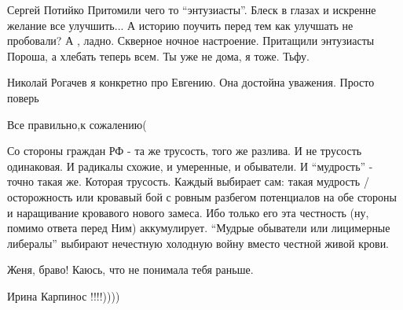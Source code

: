 \begin{itemize}
Сергей Потийко Притомили чего то \enquote{энтузиасты}. Блеск в глазах и искренне
желание все улучшить... А историю поучить перед тем как улучшать не пробовали?
А , ладно. Скверное ночное настроение. Притащили энтузиасты Пороша, а хлебать
теперь всем. Ты уже не дома, я тоже. Тьфу.


Николай Рогачев я конкретно про Евгению. Она достойна уважения. Просто поверь


Все правильно,к сожалению(


Со стороны граждан РФ - та же трусость, того же разлива. И не трусость
одинаковая. И радикалы схожие, и умеренные, и обыватели. И \enquote{мудрость} - точно
такая же. Которая трусость. Каждый выбирает сам: такая мудрость / осторожность
или кровавый бой с ровным разбегом потенциалов на обе стороны и наращивание
кровавого нового замеса. Ибо только его эта честность (ну, помимо ответа перед
Ним) аккумулирует. \enquote{Мудрые обыватели или лицимерные либералы} выбирают
нечестную холодную войну вместо честной живой крови.


Женя, браво! Каюсь, что не понимала тебя раньше.

Ирина Карпинос !!!!))))
\end{itemize}
